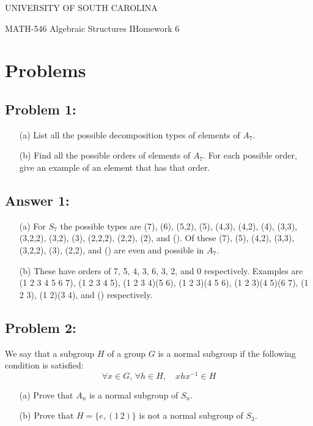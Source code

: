\documentclass[%
  10pt,
  letterpaper
]{article}
\begin{document}
\begin{center}
{UNIVERSITY OF SOUTH CAROLINA}
\end{center}
\large{MATH-546 Algebraic Structures I\hfill Homework 6}
\section*{Problems}
\subsection*{Problem 1: }
    \begin{enumerate}
        \item[(a)] List all the possible decomposition types of elements of \( A_7 \).
        \item[(b)] Find all the possible orders of elements of \( A_7 \). For each
          possible order, give an example of an element that has that order.
    \end{enumerate}

\subsection*{Answer 1:}

\begin{enumerate}
\item[(a)] For \(S_7\) the possible types are (7), (6), (5,2), (5), (4,3), (4,2), (4),
  (3,3), (3,2,2), (3,2), (3), (2,2,2), (2,2), (2), and ().  Of these (7), (5), (4,2), (3,3),
  (3,2,2), (3), (2,2), and () are even and possible in \(A_7\).
\item[(b)] These have orders of 7, 5, 4, 3, 6, 3, 2, and 0 respectively. Examples are
  (1 2 3 4 5 6 7), (1 2 3 4 5), (1 2 3 4)(5 6), (1 2 3)(4 5 6), (1 2 3)(4 5)(6 7), (1 2 3),
  (1 2)(3 4), and () respectively.
\end{enumerate}



\newpage
\subsection*{Problem 2: }
We say that a subgroup \( H \) of a group \( G \) is a normal subgroup if
the following condition is satisfied:
    \[
        \forall x \in G, \, \forall h \in H, \quad xhx^{-1} \in H
    \]
    \begin{enumerate}
        \item[(a)] Prove that \( A_n \) is a normal subgroup of \( S_n \).
        \item[(b)] Prove that \( H = \{ e, (1\,2) \} \) is not a normal subgroup of \( S_3 \).
    \end{enumerate}
\end{document}

